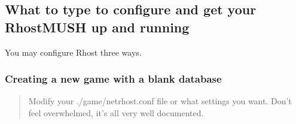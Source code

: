 \documentclass[letterpaper,10pt,english]{sphinxmanual}
\begin{document}
\subsection{What to type to configure and get your RhostMUSH up and running}
\label{\detokenize{installation:what-to-type-to-configure-and-get-your-rhostmush-up-and-running}}
\sphinxAtStartPar
You may configure Rhost three ways.


\subsubsection{Creating a new game with a blank database}
\label{\detokenize{installation:creating-a-new-game-with-a-blank-database}}\begin{quote}

\sphinxAtStartPar
Modify your ./game/netrhost.conf file or what settings you want.
Don’t feel overwhelmed, it’s all very well documented.
\end{quote}
\end{document}
